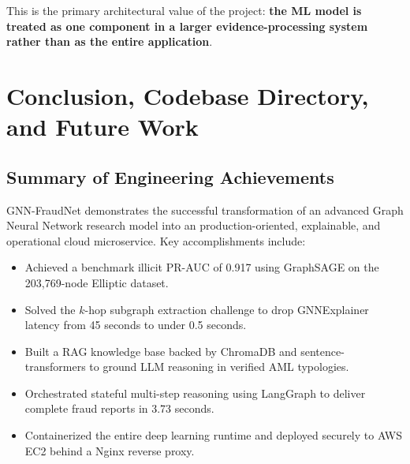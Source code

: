 \documentclass[11pt,a4paper]{report}
\begin{document}
This is the primary architectural value of the project: \textbf{the ML model is treated as one component in a larger evidence-processing system rather than as the entire application}.

\chapter{Conclusion, Codebase Directory, and Future Work}

\section{Summary of Engineering Achievements}
GNN-FraudNet demonstrates the successful transformation of an advanced Graph Neural Network research model into an production-oriented, explainable, and operational cloud microservice. Key accomplishments include:
\begin{itemize}[leftmargin=1.5em]
  \item Achieved a benchmark illicit PR-AUC of 0.917 using GraphSAGE on the 203,769-node Elliptic dataset.
  \item Solved the $k$-hop subgraph extraction challenge to drop GNNExplainer latency from 45 seconds to under 0.5 seconds.
  \item Built a RAG knowledge base backed by ChromaDB and sentence-transformers to ground LLM reasoning in verified AML typologies.
  \item Orchestrated stateful multi-step reasoning using LangGraph to deliver complete fraud reports in 3.73 seconds.
  \item Containerized the entire deep learning runtime and deployed securely to AWS EC2 behind a Nginx reverse proxy.
\end{itemize}
\end{document}
